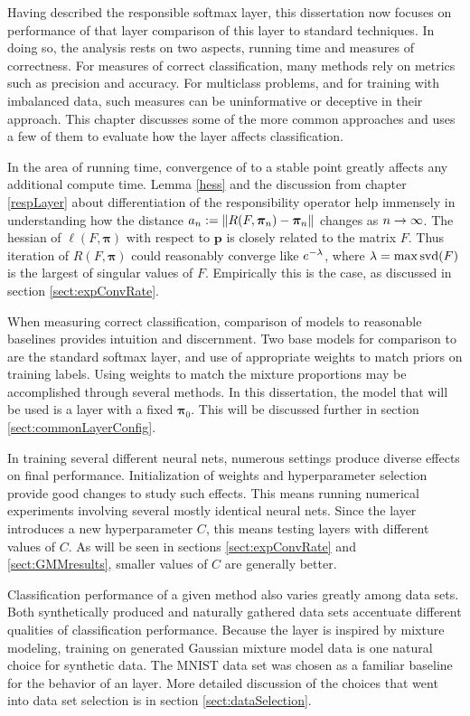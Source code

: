 \label{ch:experiments}
Having described the responsible softmax layer, this dissertation now focuses on performance of that layer comparison of this layer to standard techniques.  In doing so, the analysis rests on two aspects, running time and measures of correctness. For measures of correct classification, many methods rely on metrics such as precision and accuracy.  For multiclass problems, and for training with imbalanced data, such measures can be uninformative or deceptive in their approach.  This chapter discusses some of the more common approaches and uses a few of them to evaluate how the \RS layer affects classification.

In the area of running time, convergence of \DR to a stable point greatly affects any additional compute time. Lemma \ref{hess} and the discussion from chapter \ref{respLayer} about differentiation of the responsibility operator help immensely in understanding how the distance \(a_n := \norm{R(F,\bm\pi_n)-\bm\pi_n} \) changes as \( n\rightarrow\infty \).  The hessian of \( \ell(F,\bm\pi) \)  with respect to \( \bm p \) is closely related to the matrix \( F \). Thus iteration of \( R(F,\bm\pi) \) could reasonably converge like \( e^{-\lambda} \), where \( \lambda = \max \operatorname{svd}(F) \) is the largest of singular values of \( F \).  Empirically this is the case, as discussed in section \ref{sect:expConvRate}.

When measuring correct classification, comparison of models to reasonable baselines provides intuition and discernment. Two base models for comparison to \RS are the standard softmax layer, and use of appropriate weights to match priors on training labels.  Using weights to match the  mixture proportions may be accomplished through several methods. In this dissertation, the model that will be used is a \RS layer with a fixed \( \bm\pi_0 \). This will be discussed further in section \ref{sect:commonLayerConfig}.

In training several different neural nets, numerous settings produce diverse effects on final performance. Initialization of weights and hyperparameter selection provide good changes to study such effects. This means running numerical experiments involving several mostly identical neural nets.  Since the \RS layer introduces a new hyperparameter \( C \), this means testing layers with different values of \( C \).  As will be seen in sections \ref{sect:expConvRate} and \ref{sect:GMMresults}, smaller values of \( C\) are generally better.

Classification performance of a given method also varies greatly among data sets.  Both synthetically produced and naturally gathered data sets accentuate different qualities of classification performance. Because the \RS layer is inspired by mixture modeling, training on generated Gaussian mixture model data is one natural choice for synthetic data. The MNIST data set was chosen as a familiar baseline for the behavior of an \RS layer. More detailed discussion of the choices that went into data set selection is in section \ref{sect:dataSelection}.

